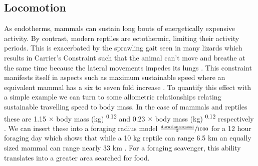 \documentclass[a4paper,12pt]{article}
\begin{document}

\subsection*{Locomotion}
As endotherms, mammals can sustain long bouts of energetically expensive activity. 
By contrast, modern reptiles are ectothermic, limiting their activity periods.
This is exacerbated by the sprawling gait seen in many lizards which results in Carrier's Constraint such that the animal can't move and breathe at the same time because the lateral movements impedes its lungs \citep{carrier1987evolution}.
This constraint manifests itself in aspects such as maximum sustainable speed where an equivalent mammal has a six to seven fold increase \citep{ruben1995evolution}.
To quantify this effect with a simple example we can turn to some allometric relationships relating sustainable travelling speed to body mass.
In the case of mammals and reptiles these are 1.15 $\times$ body mass (kg) \textsuperscript{0.12} and 0.23 $\times$ body mass (kg) \textsuperscript{0.12} respectively \citep{ruxton2004obligate}.
We can insert these into a foraging radius model $\sfrac{\frac{\text{duration} \times \text{speed}}{2}}{1000}$ for a 12 hour foraging day which shows that while a 10 kg reptile can range 6.5 km an equally sized mammal can range nearly 33 km \citep{Enstipp2006Energetics}. 
For a foraging scavenger, this ability translates into a greater area searched for food. 
\end{document}
